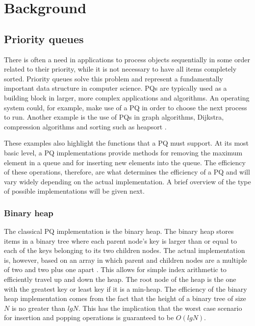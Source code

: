 \documentclass{article}
\begin{document}
\pagebreak



\section{Background}

\subsection{Priority queues}
There is often a need in applications to process objects sequentially in some order related to their priority, while it is not necessary to have all items completely sorted. Priority queues solve this problem and represent a fundamentally important data structure in computer science. PQs are typically used as a building block in larger, more complex applications and algorithms. An operating system could, for example, make use of a PQ in order to choose the next process to run. Another example is the use of PQs in graph algorithms, Dijkstra, compression algorithms and sorting such as heapsort \cite{sedgewick}.

These examples also highlight the functions that a PQ must support. At its most basic level, a PQ implementations provide methods for removing the maximum element in a queue and for inserting new elements into the queue. The efficiency of these operations, therefore, are what determines the efficiency of a PQ and will vary widely depending on the actual implementation. A brief overview of the type of possible implementations will be given next.

\subsubsection{Binary heap}
The classical PQ implementation is the binary heap. The binary heap stores items in a binary tree where each parent node's key is larger than or equal to each of the keys belonging to its two children nodes. The actual implementation is, however, based on an array in which parent and children nodes are a multiple of two and two plus one apart \cite{sedgewick}. This allows for simple index arithmetic to efficiently travel up and down the heap. The root node of the heap is the one with the greatest key or least key if it is a min-heap. The efficiency of the binary heap implementation comes from the fact that the height of a binary tree of size \(N\) is no greater than \(lg N\). This has the implication that the worst case scenario for insertion and popping operations is guaranteed to be \(O(lg N)\).
\end{document}
